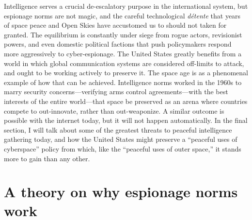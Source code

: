 \documentclass{report}
\begin{document}
Intelligence serves a crucial de-escalatory purpose in the international system, but espionage norms are not magic, and the careful technological \emph{d\'etente} that years of space peace and Open Skies have accustomed us to should not taken for granted. The equilibrium is constantly under siege from rogue actors, revisionist powers, and even domestic political factions that push policymakers respond more aggressively to cyber-espionage. The United States greatly benefits from a world in which global communication systems are considered off-limits to attack, and ought to be working actively to preserve it. The space age is as a phenomenal example of how that can be achieved. Intelligence norms worked in the 1960s to marry security concerns---verifying arms control agreements---with the best interests of the entire world---that space be preserved as an arena where countries compete to out-innovate, rather than out-weaponize. A similar outcome is possible with the internet today, but it will not happen automatically. In the final section, I will talk about some of the greatest threats to peaceful intelligence gathering today, and how the United States might preserve a ``peaceful uses of cyberspace'' policy from which, like the ``peaceful uses of outer space,'' it stands more to gain than any other.



\section{A theory on why espionage norms work}
\end{document}
